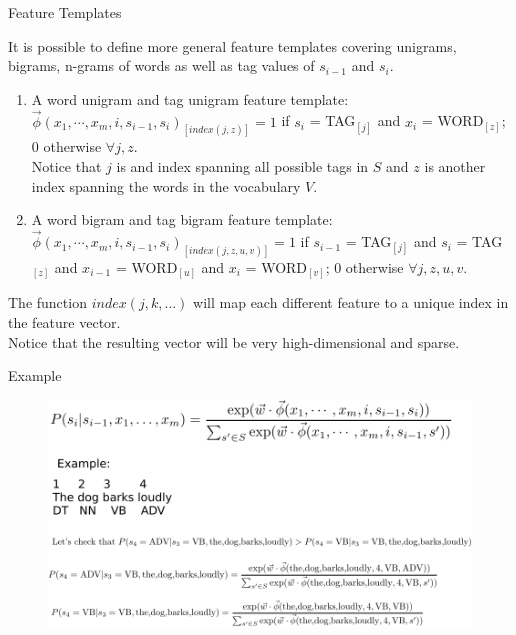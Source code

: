 \documentclass[handout]{beamer}
\begin{document}
\begin{frame}{Feature Templates}
\begin{scriptsize}

It is possible to define more general feature templates covering unigrams, bigrams, n-grams of words as well as tag values of $s_{i-1}$ and $s_i$.

\begin{enumerate}
  
 \item A word unigram and tag unigram feature template: $\vec{\phi}(x_1, \cdots, x_m, i, s_{i-1},s_i)_{[index(j,z)]}=1$ if $s_i$ = TAG$_{[j]}$ and $x_i$ = WORD$_{[z]}$; 0 otherwise $\forall j,z$. \\ Notice that $j$ is and index spanning all possible tags in $S$ and $z$ is another index spanning the words in the vocabulary $V$.
 
 \item A word bigram and tag bigram feature template: $\vec{\phi}(x_1, \cdots, x_m, i, s_{i-1},s_i)_{[index(j,z,u,v)]}=1$ if $s_{i-1}$ = TAG$_{[j]}$ and $s_i$ = TAG$_{[z]}$ and $x_{i-1}$ = WORD$_{[u]}$ and $x_{i}$ = WORD$_{[v]}$; 0 otherwise $\forall j,z,u,v$. 
 
 
\end{enumerate}

The function $index(j,k,...)$ will map each different feature to a unique index in the feature vector.  \\
Notice that the resulting vector will be very high-dimensional and sparse.
\end{scriptsize}
\end{frame}



\begin{frame}{Example}
  \begin{figure}[h]
        	\includegraphics[scale = 0.73]{pics/CRF1.pdf}
        \end{figure}
\end{frame}
\end{document}
